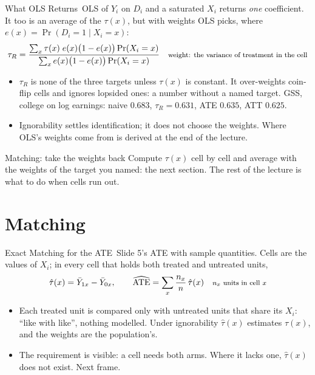 \documentclass[aspectratio=169,11pt,xcolor=dvipsnames]{beamer}
\newcommand{\core}{\,\raisebox{0.6pt}{\textcolor{corestar}{$\bigstar$}}}
\begin{document}
\begin{frame}{What OLS Returns\core}
OLS of $Y_i$ on $D_i$ and a saturated $X_i$ returns \emph{one} coefficient. It
too is an average of the $\tau(x)$, but with weights OLS picks, where
$e(x) = \Pr(D_i = 1 \mid X_i = x)$:
\begin{align*}
  \tau_R = \frac{\sum_x \tau(x)\;e(x)\big(1-e(x)\big)\Pr(X_i = x)}
                {\sum_x e(x)\big(1-e(x)\big)\Pr(X_i = x)}
  && \text{\footnotesize weight: the variance of treatment in the cell}
\end{align*}
\begin{itemize}\itemsep2pt
  \item $\tau_R$ is none of the three targets unless $\tau(x)$ is constant. It
        over-weights coin-flip cells and ignores lopsided ones: \alert{a number
        without a named target}. GSS, college on log earnings: naive $0.683$,
        $\tau_R = 0.631$, ATE $0.635$, ATT $0.625$.
  \item \alert{Ignorability settles identification; it does not choose the
        weights.} Where OLS's weights come from is derived at the end of the
        lecture.
\end{itemize}
\begin{block}{Matching: take the weights back}
Compute $\tau(x)$ cell by cell and average with the weights of the target you
named: the next section. The rest of the lecture is what to do when cells run out.
\end{block}
\end{frame}

\section[Matching]{Matching}
\begin{frame}\sectionpage\end{frame}

\begin{frame}{Exact Matching for the ATE\core}
Slide 5's ATE with sample quantities. Cells are the values of $X_i$; in every
cell that holds both treated and untreated units,
\begin{align*}
  \hat\tau(x) = \bar Y_{1x} - \bar Y_{0x},
  \qquad
  \widehat{\text{ATE}} = \sum_x \frac{n_x}{n}\,\hat\tau(x)
  && \text{\footnotesize $n_x$ units in cell $x$}
\end{align*}
\begin{itemize}\itemsep3pt
  \item Each treated unit is compared only with untreated units that share its
        $X_i$: ``like with like'', nothing modelled. Under ignorability
        $\hat\tau(x)$ estimates $\tau(x)$, and the weights are the population's.
  \item The requirement is visible: \alert{a cell needs both arms}. Where it
        lacks one, $\hat\tau(x)$ does not exist. Next frame.
\end{itemize}
\end{frame}
\end{document}
